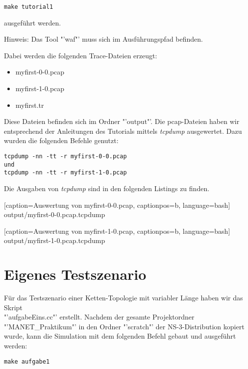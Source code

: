 \documentclass[12pt,a4paper,titlepage]{article}
\begin{document}
\begin{lstlisting}
make tutorial1
\end{lstlisting}

ausgeführt werden.
\begin{center}
Hinweis: Das Tool "'waf"' muss sich im Ausführungspfad befinden.
\end{center}

Dabei werden die folgenden Trace-Dateien erzeugt:

\begin{itemize}
\item myfirst-0-0.pcap
\item myfirst-1-0.pcap
\item myfirst.tr
\end{itemize}

Diese Dateien befinden sich im Ordner "'output"'. Die pcap-Dateien haben wir entsprechend der Anleitungen des Tutorials mittels \textit{tcpdump} ausgewertet. Dazu wurden die folgenden Befehle genutzt:

\begin{lstlisting}
tcpdump -nn -tt -r myfirst-0-0.pcap
und
tcpdump -nn -tt -r myfirst-1-0.pcap
\end{lstlisting}

Die Ausgaben von \textit{tcpdump} sind in den folgenden Listings zu finden.


	[caption={Auswertung von myfirst-0-0.pcap}\label{lst:myfirst_1_pcap},
		captionpos=b,
		language=bash] %
	{output/myfirst-0-0.pcap.tcpdump}


	[caption={Auswertung von myfirst-1-0.pcap}\label{lst:myfirst_2_pcap},
		captionpos=b,
		language=bash] %
	{output/myfirst-1-0.pcap.tcpdump}

\section{Eigenes Testszenario}

Für das Testszenario einer Ketten-Topologie mit variabler Länge haben wir das Skript\\ "'aufgabeEins.cc"' erstellt. Nachdem der gesamte Projektordner "'MANET\_Praktikum"' in den Ordner "'scratch"' der NS-3-Distribution kopiert wurde, kann die Simulation mit dem folgenden Befehl gebaut und ausgeführt werden:

\begin{lstlisting}
make aufgabe1
\end{lstlisting}
\end{document}
